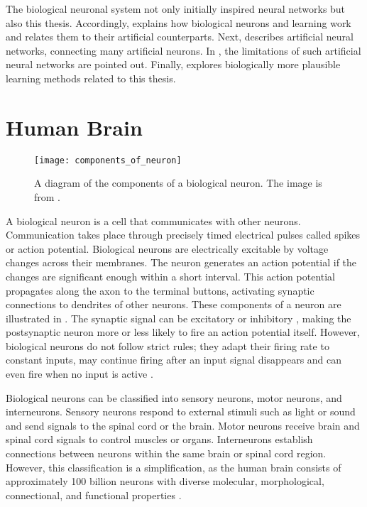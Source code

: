 The biological neuronal system not only initially inspired neural networks but also this thesis.
Accordingly,  explains how biological neurons and learning work and relates them to their artificial counterparts.
Next,   describes artificial neural networks, connecting many artificial neurons.
In , the limitations of such artificial neural networks are pointed out.
Finally,  explores biologically more plausible learning methods related to this thesis.

\section{Human Brain}
\begin{figure}[h]
    \centering
    \texttt{[image: components\_of\_neuron]}
    \caption[Diagram of the components of a biological neuron]{A diagram of the components of a biological neuron. The image is from .}
\end{figure}

A biological neuron is a cell that communicates with other neurons.
Communication takes place through precisely timed electrical pulses called spikes or action potential.
Biological neurons are electrically excitable by voltage changes across their membranes.
The neuron generates an action potential if the changes are significant enough within a short interval.
This action potential propagates along the axon to the terminal buttons, activating synaptic connections to dendrites of other neurons.
These components of a neuron are illustrated in .
The synaptic signal can be excitatory  or inhibitory , making the postsynaptic neuron more or less likely to fire an action potential itself.
However, biological neurons do not follow strict rules; they adapt their firing rate to constant inputs, may continue firing after an input signal disappears and can even fire when no input is active .

Biological neurons can be classified into sensory neurons, motor neurons, and interneurons.
Sensory neurons respond to external stimuli such as light or sound and send signals to the spinal cord or the brain.
Motor neurons receive brain and spinal cord signals to control muscles or organs.
Interneurons establish connections between neurons within the same brain or spinal cord region.
However, this classification is a simplification, as the human brain consists of approximately 100 billion neurons  with diverse molecular, morphological, connectional, and functional properties .

